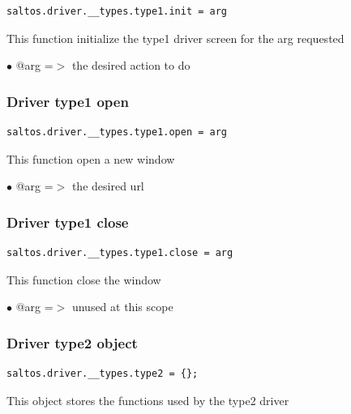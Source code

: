 \documentclass[a4paper]{article}
\begin{document}
\begin{lstlisting}
saltos.driver.__types.type1.init = arg
\end{lstlisting}

This function initialize the type1 driver screen for the arg requested

\begin{compactitem}
\item[\color{myblue}$\bullet$] @arg =$>$ the desired action to do
\end{compactitem}

\hypertarget{toc184}{}
\subsubsection{Driver type1 open}

\begin{lstlisting}
saltos.driver.__types.type1.open = arg
\end{lstlisting}

This function open a new window

\begin{compactitem}
\item[\color{myblue}$\bullet$] @arg =$>$ the desired url
\end{compactitem}

\hypertarget{toc185}{}
\subsubsection{Driver type1 close}

\begin{lstlisting}
saltos.driver.__types.type1.close = arg
\end{lstlisting}

This function close the window

\begin{compactitem}
\item[\color{myblue}$\bullet$] @arg =$>$ unused at this scope
\end{compactitem}

\hypertarget{toc186}{}
\subsubsection{Driver type2 object}

\begin{lstlisting}
saltos.driver.__types.type2 = {};
\end{lstlisting}

This object stores the functions used by the type2 driver
\end{document}
